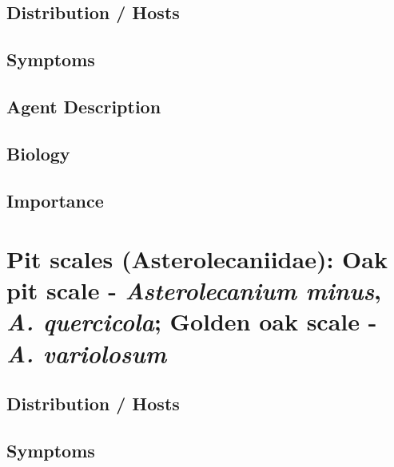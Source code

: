 \documentclass[
]{book}
\begin{document}
\subsection*{Distribution / Hosts}\label{distribution-hosts-10}

\subsection*{Symptoms}\label{symptoms-10}

\subsection*{Agent Description}\label{agent-description-10}

\subsection*{Biology}\label{biology-10}

\subsection*{Importance}\label{importance-10}

\section*{\texorpdfstring{Pit scales (Asterolecaniidae): Oak pit scale - \emph{Asterolecanium minus}, \emph{A. quercicola}; Golden oak scale - \emph{A. variolosum}}{Pit scales (Asterolecaniidae): Oak pit scale - Asterolecanium minus, A. quercicola; Golden oak scale - A. variolosum}}\label{pit-scales-asterolecaniidae-oak-pit-scale---asterolecanium-minus-a.-quercicola-golden-oak-scale---a.-variolosum}

\subsection*{Distribution / Hosts}\label{distribution-hosts-11}

\subsection*{Symptoms}\label{symptoms-11}
\end{document}
